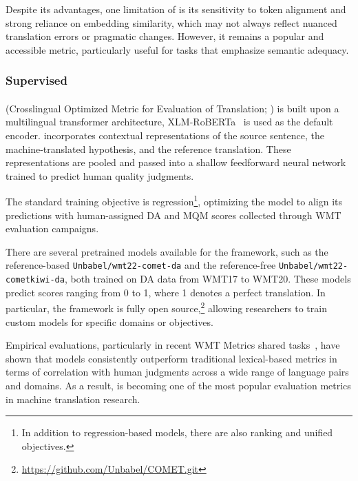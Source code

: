 Despite its advantages, one limitation of \bertscore is its sensitivity to token alignment and strong reliance on embedding similarity, which may not always reflect nuanced translation errors or pragmatic changes. However, it remains a popular and accessible metric, particularly useful for tasks that emphasize semantic adequacy.

\subsubsection{Supervised}
\noindent\paragraph{\comet} (Crosslingual Optimized Metric for Evaluation of Translation; \citep{rei-etal-2020-comet}) is built upon a multilingual transformer architecture, XLM-RoBERTa~\citep{xlm-r} is used as the default encoder. \comet incorporates contextual representations of the source sentence, the machine-translated hypothesis, and the reference translation. These representations are pooled and passed into a shallow feedforward neural network trained to predict human quality judgments.

The standard training objective is regression\footnote{In addition to regression-based models, there are also ranking and unified objectives.}, optimizing the model to align its predictions with human-assigned DA and MQM scores collected through WMT evaluation campaigns.

There are several pretrained models available for the \comet framework, such as the reference-based \texttt{Unbabel/wmt22-comet-da} and the reference-free \texttt{Unbabel/wmt22-cometkiwi-da}, both trained on DA data from WMT17 to WMT20. These models predict scores ranging from 0 to 1, where 1 denotes a perfect translation. In particular, the \comet framework is fully open source,\footnote{\url{https://github.com/Unbabel/COMET.git}} allowing researchers to train custom models for specific domains or objectives.

Empirical evaluations, particularly in recent WMT Metrics shared tasks~\citep{freitag-etal-2021-results, freitag-etal-2022-results, freitag-etal-2023-results}, have shown that \comet models consistently outperform traditional lexical-based metrics in terms of correlation with human judgments across a wide range of language pairs and domains. As a result, \comet is becoming one of the most popular evaluation metrics in machine translation research.

